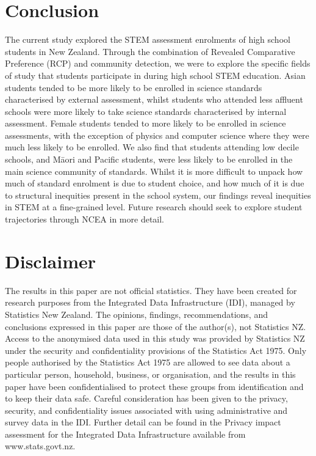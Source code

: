 \documentclass[a4paper]{article}
\begin{document}
\section{Conclusion}
The current study explored the STEM assessment enrolments of high school students in New Zealand. Through the combination of Revealed Comparative Preference (RCP) and community detection, we were to explore the specific fields of study that students participate in during high school STEM education. Asian students tended to be more likely to be enrolled in science standards characterised by external assessment, whilst students who attended less affluent schools were more likely to take science standards characterised by internal assessment. Female students tended to more likely to be enrolled in science assessments, with the exception of physics and computer science where they were much less likely to be enrolled. We also find that students attending low decile schools, and M\={a}ori and Pacific students, were less likely to be enrolled in the main science community of standards. Whilst it is more difficult to unpack how much of standard enrolment is due to student choice, and how much of it is due to structural inequities present in the school system, our findings reveal inequities in STEM at a fine-grained level. Future research should seek to explore student trajectories through NCEA in more detail.



\section{Disclaimer}
The results in this paper are not official statistics. They have been created for research purposes from the Integrated Data Infrastructure (IDI), managed by Statistics New Zealand. The opinions, findings, recommendations, and conclusions expressed in this paper are those of the author(s), not Statistics NZ. Access to the anonymised data used in this study was provided by Statistics NZ under the security and confidentiality provisions of the Statistics Act 1975. Only people authorised by the Statistics Act 1975 are allowed to see data about a particular person, household, business, or organisation, and the results in this paper have been confidentialised to protect these groups from identification and to keep their data safe. Careful consideration has been given to the privacy, security, and confidentiality issues associated with using administrative and survey data in the IDI. Further detail can be found in the Privacy impact assessment for the Integrated Data Infrastructure available from www.stats.govt.nz. 



\end{document}
